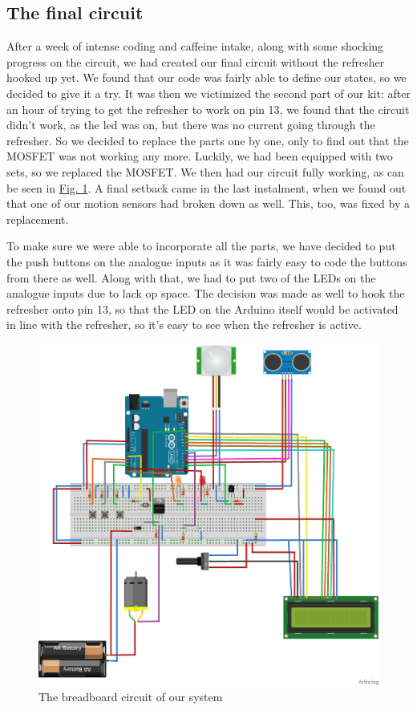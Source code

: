\documentclass[a4paper, 12pt]{article}
\begin{document}
\subsection{The final circuit}
After a week of intense coding and caffeine intake, along with some shocking progress on the circuit, we had created our final circuit without the refresher hooked up yet. We found that our code was fairly able to define our states, so we decided to give it a try. It was then we victimized the second part of our kit: after an hour of trying to get the refresher to work on pin 13, we found that the circuit didn't work, as the led was on, but there was no current going through the refresher. So we decided to replace the parts one by one, only to find out that the MOSFET was not working any more. Luckily, we had been equipped with two sets, so we replaced the MOSFET. We then had our circuit fully working, as can be seen in  \hyperref[fig:circuit]{Fig. 1}. A final setback came in the last instalment, when we found out that one of our motion sensors had broken down as well. This, too, was fixed by a replacement.

To make sure we were able to incorporate all the parts, we have decided to put the push buttons on the analogue inputs as it was fairly easy to code the buttons from there as well. Along with that, we had to put two of the LEDs on the analogue inputs due to lack op space. The decision was made as well to hook the refresher onto pin 13, so that the LED on the Arduino itself would be activated in line with the refresher, so it's easy to see when the refresher is active.

\begin{figure} \label{fig:circuit}
\includegraphics[scale=0.4]{schakeling_bb.png}

\caption{The breadboard circuit of our system}
\end{figure} 
\end{document}
